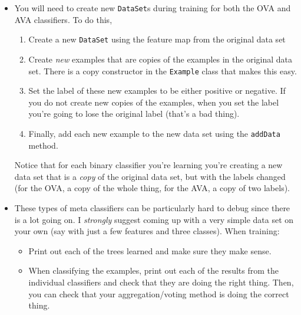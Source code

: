 \documentclass[11pt]{article}
\begin{document}
\begin{itemize}
\begin{itemize}
\end{itemize}

\item You will need to create new \texttt{DataSet}s during training for both the OVA and AVA classifiers.  To do this, 

\begin{enumerate}

\item Create a new \texttt{DataSet} using the feature map from the original data set

\item Create \emph{new} examples that are copies of the examples in the original data set.  There is a copy constructor in the \texttt{Example} class that makes this easy.

\item Set the label of these new examples to be either positive or negative.  If you do not create new copies of the examples, when you set the label you're going to lose the original label (that's a bad thing).

\item Finally, add each new example to the new data set using the \texttt{addData} method.

\end{enumerate}

Notice that for each binary classifier you're learning you're creating a new data set that is a \emph{copy} of the original data set, but with the labels changed (for the OVA, a copy of the whole thing, for the AVA, a copy of two labels).

\item These types of meta classifiers can be particularly hard to debug since there is a lot going on.   I \emph{strongly} suggest coming up with a very simple data set on your own (say with just a few features and three classes).  When training:

\begin{itemize}
\item Print out each of the trees learned and make sure they make sense.

\item When classifying the examples, print out each of the results from the individual classifiers and check that they are doing the right thing.  Then, you can check that your aggregation/voting method is doing the correct thing.
\end{itemize}

\end{itemize}
\end{document}
